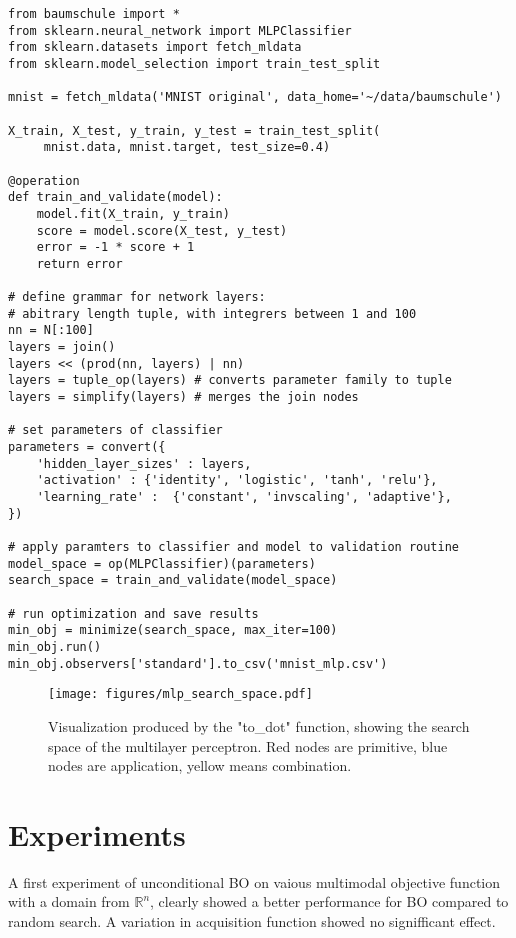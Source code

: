 \documentclass[english]{article}
\begin{document}
\begin{verbatim}
from baumschule import *
from sklearn.neural_network import MLPClassifier
from sklearn.datasets import fetch_mldata
from sklearn.model_selection import train_test_split

mnist = fetch_mldata('MNIST original', data_home='~/data/baumschule')

X_train, X_test, y_train, y_test = train_test_split(
     mnist.data, mnist.target, test_size=0.4)

@operation
def train_and_validate(model):
    model.fit(X_train, y_train)
    score = model.score(X_test, y_test)
    error = -1 * score + 1
    return error

# define grammar for network layers:
# abitrary length tuple, with integrers between 1 and 100
nn = N[:100]
layers = join()
layers << (prod(nn, layers) | nn)
layers = tuple_op(layers) # converts parameter family to tuple
layers = simplify(layers) # merges the join nodes

# set parameters of classifier
parameters = convert({
    'hidden_layer_sizes' : layers,
    'activation' : {'identity', 'logistic', 'tanh', 'relu'},
    'learning_rate' :  {'constant', 'invscaling', 'adaptive'},
})

# apply paramters to classifier and model to validation routine
model_space = op(MLPClassifier)(parameters)
search_space = train_and_validate(model_space)

# run optimization and save results
min_obj = minimize(search_space, max_iter=100)
min_obj.run()
min_obj.observers['standard'].to_csv('mnist_mlp.csv')

\end{verbatim}

\begin{figure}
  \texttt{[image: figures/mlp\_search\_space.pdf]}
  \caption{Visualization produced by the "to\_dot" function, showing the search space of the multilayer perceptron. Red nodes are primitive, blue nodes are application, yellow means combination.}
  \label{mlp_search_space}
\end{figure}


\section{Experiments}
A first experiment of unconditional BO on vaious multimodal objective function with a domain from $\mathbb{R}^n$, clearly showed a better performance for BO compared to random search. A variation in acquisition function showed no signifficant effect.
\end{document}
